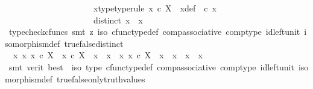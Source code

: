 \begin{isabellebody}
\ \ \ \ \ \ \ \ \ \ \ \ \ \ \ \ \ \ \ \ \ x{}{\isacharunderscore}{\kern0pt}type{\isacharbrackleft}{\kern0pt}type{\isacharunderscore}{\kern0pt}rule{\isacharbrackright}{\kern0pt}{\isacharcolon}{\kern0pt}\ {\isachardoublequoteopen}x{}\ {\isasymin}\isactrlsub c\ X{\isachardoublequoteclose}\ \ x{}{\isacharunderscore}{\kern0pt}def{\isacharcolon}{\kern0pt}\ {\isachardoublequoteopen}{\isasymphi}\ {\isasymcirc}\isactrlsub c\ x{}\ {\isacharequal}{\kern0pt}\ {\isasymf}{\isachardoublequoteclose}\ \isanewline
\ \ \ \ \ \ \ \ \ \ \ \ \ \ \ \ \ \ \ \ \ distinct{\isacharcolon}{\kern0pt}\ {\isachardoublequoteopen}x{}\ {\isasymnoteq}\ x{}{\isachardoublequoteclose}\isanewline
\ \ \ \ \isamarkupfalse%
\ {\isacharparenleft}{\kern0pt}typecheck{\isacharunderscore}{\kern0pt}cfuncs{\isacharcomma}{\kern0pt}\ smt\ {\isacharparenleft}{\kern0pt}z{}{\isacharparenright}{\kern0pt}\ {\isasymphi}{\isacharunderscore}{\kern0pt}iso\ cfunc{\isacharunderscore}{\kern0pt}type{\isacharunderscore}{\kern0pt}def\ comp{\isacharunderscore}{\kern0pt}associative\ comp{\isacharunderscore}{\kern0pt}type\ id{\isacharunderscore}{\kern0pt}left{\isacharunderscore}{\kern0pt}unit{}\ isomorphism{\isacharunderscore}{\kern0pt}def\ true{\isacharunderscore}{\kern0pt}false{\isacharunderscore}{\kern0pt}distinct{\isacharparenright}{\kern0pt}\isanewline
\ \ \isamarkupfalse%
\ \isamarkupfalse%
\ \ {\isachardoublequoteopen}{\isasymexists}x{}\ x{}{\isachardot}{\kern0pt}\ x{}\ {\isasymin}\isactrlsub c\ X\ {\isasymand}\ x{}\ {\isasymin}\isactrlsub c\ X\ {\isasymand}\ x{}\ {\isasymnoteq}\ x{}\ {\isasymand}\ {\isacharparenleft}{\kern0pt}{\isasymforall}x{\isachardot}{\kern0pt}\ x\ {\isasymin}\isactrlsub c\ X\ {\isasymlongrightarrow}\ x\ {\isacharequal}{\kern0pt}\ x{}\ {\isasymor}\ x\ {\isacharequal}{\kern0pt}\ x{}{\isacharparenright}{\kern0pt}{\isachardoublequoteclose}\isanewline
\ \ \ \ \isamarkupfalse%
\ {\isacharparenleft}{\kern0pt}smt\ {\isacharparenleft}{\kern0pt}verit{\isacharcomma}{\kern0pt}\ best{\isacharparenright}{\kern0pt}\ \ {\isasymphi}{\isacharunderscore}{\kern0pt}iso\ {\isasymphi}{\isacharunderscore}{\kern0pt}type\ cfunc{\isacharunderscore}{\kern0pt}type{\isacharunderscore}{\kern0pt}def\ comp{\isacharunderscore}{\kern0pt}associative{}\ comp{\isacharunderscore}{\kern0pt}type\ id{\isacharunderscore}{\kern0pt}left{\isacharunderscore}{\kern0pt}unit{}\ isomorphism{\isacharunderscore}{\kern0pt}def\ true{\isacharunderscore}{\kern0pt}false{\isacharunderscore}{\kern0pt}only{\isacharunderscore}{\kern0pt}truth{\isacharunderscore}{\kern0pt}values{\isacharparenright}{\kern0pt}\isanewline

\end{isabellebody}
